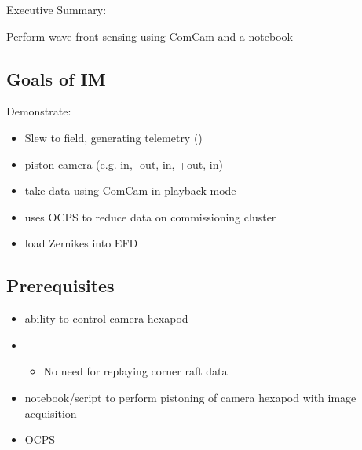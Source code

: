 
Executive Summary:

Perform wave-front sensing using ComCam and a notebook

\subsection{Goals of IM}
Demonstrate:
\begin{itemize}
\item Slew to field, generating telemetry (\cf {})
\item piston camera (e.g. in, -out, in, +out, in)
\item take data using ComCam in playback mode
\item uses \gls{OCPS} to reduce data on commissioning cluster
\item load Zernikes into \gls{EFD}
\end{itemize}

\subsection{Prerequisites}
\begin{itemize}
\item ability to control camera hexapod
\item {}
  \begin{itemize}
  \item No need for replaying corner raft data
  \end{itemize}
\item notebook/script to perform pistoning of camera hexapod with image acquisition
\item \gls{OCPS}
\end{itemize}
